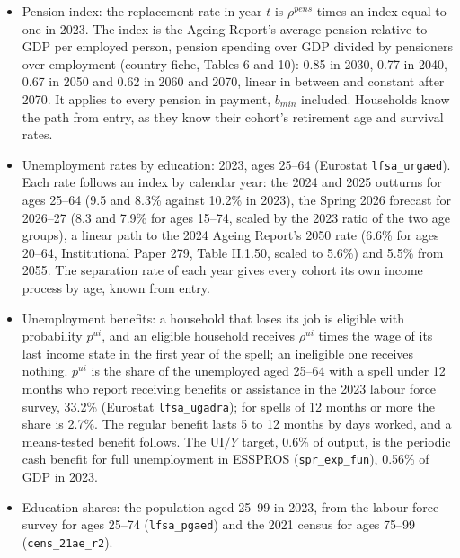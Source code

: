 \documentclass[11pt,a4paper]{article}
\begin{document}
\begin{itemize}
  age (5.5 years) over 2022--70, and reaches 69.7 in 2100. A cohort retires
  at the age in force when it gets there: 67.7 for the cohort entering in
  2023, 69.4 for the one entering in 2050. The model is annual, so each cohort is split between the two whole
  ages around its average, in the proportions that reproduce it.
\item Pension index: the replacement rate in year $t$ is $\rho^{pens}$ times
  an index equal to one in 2023. The index is the Ageing Report's average
  pension relative to GDP per employed person, pension spending over GDP
  divided by pensioners over employment (country fiche, Tables 6 and 10):
  0.85 in 2030, 0.77 in 2040, 0.67 in 2050 and 0.62 in 2060 and 2070,
  linear in between and constant after 2070. It applies to every pension in payment, $b_{min}$ included.
  Households know the path from entry, as they know their cohort's retirement
  age and survival rates.
\item Unemployment rates by education: 2023, ages 25--64 (Eurostat
  \texttt{lfsa\_urgaed}). Each rate follows an index by calendar year: the
  2024 and 2025 outturns for ages 25--64 (9.5 and 8.3\% against 10.2\% in
  2023), the Spring 2026 forecast for 2026--27 (8.3 and 7.9\% for ages
  15--74, scaled by the 2023 ratio of the two age groups), a linear path to
  the 2024 Ageing Report's 2050 rate (6.6\% for ages 20--64, Institutional
  Paper 279, Table II.1.50, scaled to 5.6\%) and 5.5\% from 2055. The separation rate of each year gives every
  cohort its own income process by age, known from entry.
\item Unemployment benefits: a household that loses its job is eligible
  with probability $p^{ui}$, and an eligible household receives
  $\rho^{ui}$ times the wage of its last income state in the first year of
  the spell; an ineligible one receives nothing. $p^{ui}$ is the share of
  the unemployed aged 25--64 with a spell under 12 months who report
  receiving benefits or assistance in the 2023 labour force survey, 33.2\%
  (Eurostat \texttt{lfsa\_ugadra}); for spells of 12 months or more the
  share is 2.7\%. The regular benefit lasts 5 to 12 months by days worked,
  and a means-tested benefit follows. The UI$/Y$ target, 0.6\% of output, is the
  periodic cash benefit for full unemployment in ESSPROS
  (\texttt{spr\_exp\_fun}), 0.56\% of GDP in 2023.
\item Education shares: the population aged 25--99 in 2023, from the labour
  force survey for ages 25--74 (\texttt{lfsa\_pgaed}) and the 2021 census for
  ages 75--99 (\texttt{cens\_21ae\_r2}).
\end{itemize}
\end{document}
